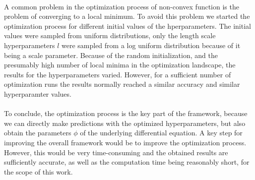 \documentclass{article}
\begin{document}
\\
A common problem in the optimization process of non-convex function is the problem of converging to a local minimum. To avoid this problem we started the optimization process for different initial values of the hperparameters. The initial values were sampled from uniform distributions, only the length scale hyperparameters $l$ were sampled from a log uniform distribution because of it being a scale parameter. Because of the random initialization, and the presumably high number of local minima in the optimization landscape, the results for the hyperparameters varied. However, for a sufficient number of optimization runs the results normally reached a similar accuracy and similar hyperparamter values.\\
\\
To conclude, the optimization process is the key part of the framework, because we can directly make predictions with the optimized hyperparameters, but also obtain the parameters $\phi$ of the underlying differential equation. A key step for improving the overall framework would be to improve the optimization process. However, this would be very time-consuming and the obtained results are sufficiently accurate, as well as the computation time being reasonably short, for the scope of this work.\\
\end{document}
